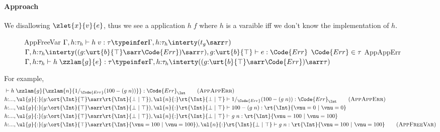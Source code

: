 \paragraph{Approach} We disallowing $\zlet{x}{v}{e}$, thus we see a application $h\;f$ where $h$ is a varaible iff we don't know the implementation of $h$.
\begin{figure}[!t]
{\small
\mprooftr{50mm}
  {}
  {AppFreeVar}
  {$\Gamma, h{:}\tau_h \vdash h\;v : \tau \typeinfer \Gamma, h{:}\tau_h \interty (t_g \sarr \tau)$}
\\[.8em]
\mprooftr{70mm}
  {$\Gamma, h{:}\tau_h \interty ((g{:}\urt{b}{\top} \sarr \Code{Err}) \sarr \tau), g{:}\urt{b}{\top} \vdash e : \Code{Err}$ \quad $\Code{Err} \in \tau$}
  {AppAppErr}
  {$\Gamma, h{:}\tau_h \vdash h\;\zzlam{g}{e} : \tau \typeinfer \Gamma, h{:}\tau_h \interty ((g{:}\urt{b}{\top} \sarr \Code{Err}) \sarr \tau)$}
}
\end{figure}

For example,
\begin{align*}
    &\vdash h\; \zzlam{g}{\zzlam{n}{1 /_{\Code{Err}} (100 - (g\; n))}} : \Code{Err}_{\Int} \tag{$\textsc{AppAppErr}$}
    \\&h{:}..., \ul{g}{:}(y{:}\ort{\Int}{\top}\sarr\rt{\Int}{\bot ~|~ \top}), \ul{n}{:}\rt{\Int}{\bot ~|~ \top} \vdash 1 /_{\Code{Err}} (100 - (g\; n)) : \Code{Err}_{\Int} \tag{$\textsc{AppAppErr}$}
    \\&h{:}..., \ul{g}{:}(y{:}\ort{\Int}{\top}\sarr\rt{\Int}{\bot ~|~ \top}), \ul{n}{:}\rt{\Int}{\bot ~|~ \top} \vdash 100 - (g\; n) : \rt{\Int}{\vnu = 0 ~|~ \vnu = 0}
    \\&h{:}..., \ul{g}{:}(y{:}\ort{\Int}{\top}\sarr\rt{\Int}{\bot ~|~ \top}), \ul{n}{:}\rt{\Int}{\bot ~|~ \top} \vdash g\; n : \rt{\Int}{\vnu = 100 ~|~ \vnu = 100}
    \\&h{:}..., \ul{g}{:}(y{:}\ort{\Int}{\top}\sarr\rt{\Int}{\vnu = 100 ~|~ \vnu = 100}), \ul{n}{:}\rt{\Int}{\bot ~|~ \top} \vdash g\; n : \rt{\Int}{\vnu = 100 ~|~ \vnu = 100} \tag{$\textsc{AppFreeVar}$}
\end{align*}\noindent

